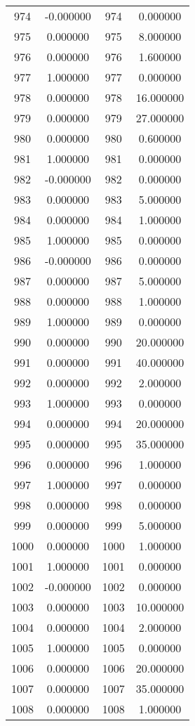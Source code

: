 \documentclass[12pt]{article}
\begin{document}
\begin{longtable}{@{}cccc@{}}
974 & -0.000000 & 974 & 0.000000 \\
975 & 0.000000 & 975 & 8.000000 \\
976 & 0.000000 & 976 & 1.600000 \\
977 & 1.000000 & 977 & 0.000000 \\
978 & 0.000000 & 978 & 16.000000 \\
979 & 0.000000 & 979 & 27.000000 \\
980 & 0.000000 & 980 & 0.600000 \\
981 & 1.000000 & 981 & 0.000000 \\
982 & -0.000000 & 982 & 0.000000 \\
983 & 0.000000 & 983 & 5.000000 \\
984 & 0.000000 & 984 & 1.000000 \\
985 & 1.000000 & 985 & 0.000000 \\
986 & -0.000000 & 986 & 0.000000 \\
987 & 0.000000 & 987 & 5.000000 \\
988 & 0.000000 & 988 & 1.000000 \\
989 & 1.000000 & 989 & 0.000000 \\
990 & 0.000000 & 990 & 20.000000 \\
991 & 0.000000 & 991 & 40.000000 \\
992 & 0.000000 & 992 & 2.000000 \\
993 & 1.000000 & 993 & 0.000000 \\
994 & 0.000000 & 994 & 20.000000 \\
995 & 0.000000 & 995 & 35.000000 \\
996 & 0.000000 & 996 & 1.000000 \\
997 & 1.000000 & 997 & 0.000000 \\
998 & 0.000000 & 998 & 0.000000 \\
999 & 0.000000 & 999 & 5.000000 \\
1000 & 0.000000 & 1000 & 1.000000 \\
1001 & 1.000000 & 1001 & 0.000000 \\
1002 & -0.000000 & 1002 & 0.000000 \\
1003 & 0.000000 & 1003 & 10.000000 \\
1004 & 0.000000 & 1004 & 2.000000 \\
1005 & 1.000000 & 1005 & 0.000000 \\
1006 & 0.000000 & 1006 & 20.000000 \\
1007 & 0.000000 & 1007 & 35.000000 \\
1008 & 0.000000 & 1008 & 1.000000 \\

\end{longtable}
\end{document}
